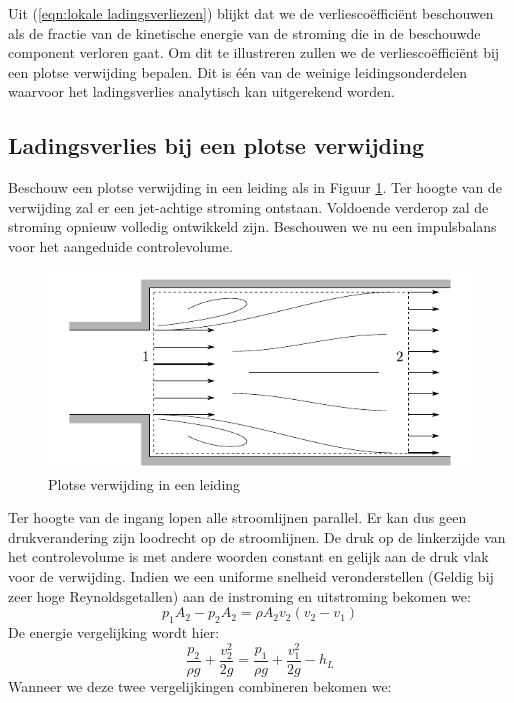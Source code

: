 Uit (\ref{eqn:lokale ladingsverliezen}) blijkt dat we de verliescoëfficiënt beschouwen als de fractie van de kinetische energie van de stroming die in de beschouwde component verloren gaat. Om dit te illustreren zullen we de verliescoëfficiënt bij een plotse verwijding bepalen. Dit is één van de weinige leidingsonderdelen waarvoor het ladingsverlies analytisch kan uitgerekend worden.

	\subsection{Ladingsverlies bij een plotse verwijding}
Beschouw een plotse verwijding in een leiding als in Figuur \ref{fig:Plotse verwijding}. Ter hoogte van de verwijding zal er een jet-achtige stroming ontstaan. Voldoende verderop zal de stroming opnieuw volledig ontwikkeld zijn. Beschouwen we nu een impulsbalans voor het aangeduide controlevolume.
\begin{figure}
	\centering
	\includegraphics{fig/leidingstelsels/Plotse_verwijding}
	\caption{Plotse verwijding in een leiding}
	\label{fig:Plotse verwijding}
\end{figure}
Ter hoogte van de ingang lopen alle stroomlijnen parallel. Er kan dus geen drukverandering zijn loodrecht op de stroomlijnen. De druk op de linkerzijde van het controlevolume is met andere woorden constant en gelijk aan de druk vlak voor de verwijding. Indien we een uniforme snelheid veronderstellen (Geldig bij zeer hoge Reynoldsgetallen) aan de instroming en uitstroming bekomen we:
\begin{equation}
	p_1 A_2 - p_2 A_2 = \rho A_2 v_2 (v_2-v_1)
\end{equation}
De energie vergelijking wordt hier:
\begin{equation}
	\frac{p_2}{\rho g} + \frac{v_2^2}{2 g} = \frac{p_1}{\rho g} + \frac{v_1^2}{2 g} - h_L
\end{equation}
Wanneer we deze twee vergelijkingen combineren bekomen we:
